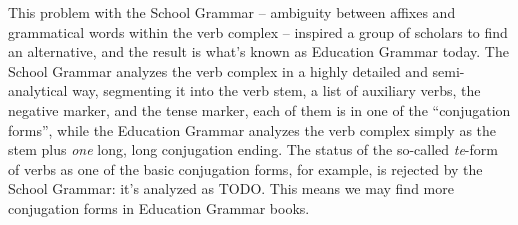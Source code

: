\documentclass[UTF8, a4paper, oneside, scheme=plain]{ctexart}
\newcommand{\corpus}[1]{\emph{#1}}
\begin{document}
This problem with the School Grammar -- 
ambiguity between affixes and grammatical words within the verb complex -- 
inspired a group of scholars to find an alternative,
and the result is what's known as Education Grammar today.
The School Grammar analyzes the verb complex in a highly detailed and semi-analytical way,
segmenting it into the verb stem, a list of auxiliary verbs, the negative marker, and the tense marker,
each of them is in one of the ``conjugation forms'',
while the Education Grammar analyzes the verb complex 
simply as the stem plus \emph{one} long, long conjugation ending.
The status of the so-called \corpus{te}-form of verbs as one of the basic conjugation forms, for example,
is rejected by the School Grammar:
it's analyzed as TODO.
This means we may find more conjugation forms in Education Grammar books.
\end{document}
